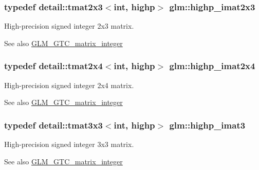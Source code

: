 \subsubsection[{\texorpdfstring{highp\+\_\+imat2x3}{highp_imat2x3}}]{\setlength{\rightskip}{0pt plus 5cm}typedef detail\+::tmat2x3$<$int, highp$>$ {\bf glm\+::highp\+\_\+imat2x3}}\hypertarget{group__gtc__matrix__integer_ga7b7079ab95ac8f533ac565fcf1341c76}{}\label{group__gtc__matrix__integer_ga7b7079ab95ac8f533ac565fcf1341c76}
High-\/precision signed integer 2x3 matrix. \begin{DoxySeeAlso}{See also}
\hyperlink{group__gtc__matrix__integer}{G\+L\+M\+\_\+\+G\+T\+C\+\_\+matrix\+\_\+integer} 
\end{DoxySeeAlso}
\subsubsection[{\texorpdfstring{highp\+\_\+imat2x4}{highp_imat2x4}}]{\setlength{\rightskip}{0pt plus 5cm}typedef detail\+::tmat2x4$<$int, highp$>$ {\bf glm\+::highp\+\_\+imat2x4}}\hypertarget{group__gtc__matrix__integer_ga84aec2e744ecac589fe8d502266e8efc}{}\label{group__gtc__matrix__integer_ga84aec2e744ecac589fe8d502266e8efc}
High-\/precision signed integer 2x4 matrix. \begin{DoxySeeAlso}{See also}
\hyperlink{group__gtc__matrix__integer}{G\+L\+M\+\_\+\+G\+T\+C\+\_\+matrix\+\_\+integer} 
\end{DoxySeeAlso}
\subsubsection[{\texorpdfstring{highp\+\_\+imat3}{highp_imat3}}]{\setlength{\rightskip}{0pt plus 5cm}typedef detail\+::tmat3x3$<$int, highp$>$ {\bf glm\+::highp\+\_\+imat3}}\hypertarget{group__gtc__matrix__integer_gaf12b3aa7e16a88b1fcf51be9a132048c}{}\label{group__gtc__matrix__integer_gaf12b3aa7e16a88b1fcf51be9a132048c}
High-\/precision signed integer 3x3 matrix. \begin{DoxySeeAlso}{See also}
\hyperlink{group__gtc__matrix__integer}{G\+L\+M\+\_\+\+G\+T\+C\+\_\+matrix\+\_\+integer} 
\end{DoxySeeAlso}

